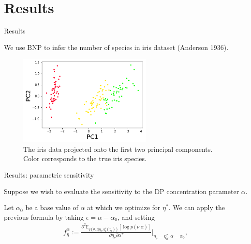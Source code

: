 \documentclass[10pt]{beamer}\usepackage[]{graphicx}\usepackage[]{color}
\newcommand{\Expect}{\mathbb{E}}
\newcommand{\etaopt}{\eta^{*}}
\newcommand{\etazopt}{\eta_z^{*}}
\newcommand{\etathetaopt}{\eta_\theta^{*}}
\newcommand{\QExpect}
{\Expect_{q\left(\theta, z \vert \eta_\theta, \etazopt(\eta_\theta)\right)}}
\begin{document}
\section{Results}

\begin{frame}{Results}

We use BNP to infer the number of species in iris dataset (Anderson 1936). 

\begin{figure}[!h]
\centering
\includegraphics[width = 0.6\textwidth]{./images/iris_data.png}

\caption{The iris data projected onto the first two principal components. Color corresponds to the true iris species. }

\setlength{\textfloatsep}{-10pt}
\end{figure}

\end{frame}

\begin{frame}{Results: parametric sensitivity}

Suppose we wish to evaluate the sensitivity to the DP concentration parameter $\alpha$.

\pause 

Let $\alpha_0$ be a base value of $\alpha$ at which we optimize for
$\etaopt$. We can apply the previous formula by taking $\epsilon = \alpha - \alpha_0$, and setting 
\begin{align*}
f^\alpha_\eta := \frac{\partial^2
    \QExpect
        \left[ \log p\left(\nu \vert \alpha \right) \right]}
{ \partial \eta_\theta \partial \alpha^T }
    \Big\rvert_{\eta_\theta = \etathetaopt, \alpha = \alpha_0},
\end{align*}

\end{frame}
\end{document}
